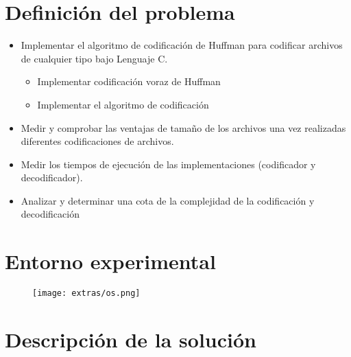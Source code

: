 \documentclass[12 pt]{report}
\begin{document}
\section*{Definición del problema}
\begin{itemize}
\item Implementar el algoritmo de codificación de Huffman para codificar archivos de cualquier tipo bajo Lenguaje C.
  \begin{itemize}
  \item Implementar codificación voraz de Huffman
  \item Implementar el algoritmo de codificación
  \end{itemize}
\item Medir y comprobar las ventajas de tamaño de los archivos una vez realizadas diferentes codificaciones de archivos.
\item Medir los tiempos de ejecución de las implementaciones (codificador y decodificador).
\item Analizar y determinar una cota de la complejidad de la codificación y decodificación  
\end{itemize}


\section*{Entorno experimental}
\begin{figure}[ht]
  \centering
  \texttt{[image: extras/os.png]}
  \caption{\label{Entorno experimental usado} }
\end{figure}
\newpage




\section*{Descripción de la solución}
\end{document}
